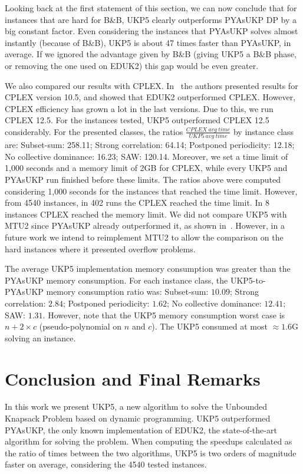 \documentclass[runningheads,a4paper]{llncs}
\begin{document}
Looking back at the first statement of this section, we can now conclude that for instances that are hard for B\&B, UKP5 clearly outperforms PYAsUKP DP by a big constant factor. 
Even considering the instances that PYAsUKP solves almost instantly (because of B\&B), UKP5 is about 47 times faster than PYAsUKP, in average. 
If we ignored the advantage given by B\&B (giving UKP5 a B\&B phase, or removing the one used on EDUK2) this gap would be even greater.

We also compared our results with CPLEX.
In~\cite{pya} the authors presented results for CPLEX version 10.5, and showed that EDUK2 outperformed CPLEX.
However, CPLEX efficiency has grown a lot in the last versions. Due to this, we run CPLEX 12.5.
For the instances tested, UKP5 outperformed CPLEX 12.5 considerably.
For the presented classes, the ratios \(\frac{CPLEX~avg~time}{UKP5~avg~time}\) by instance class are: 
Subset-sum: 258.11; Strong correlation: 64.14; Postponed periodicity: 12.18; No collective dominance: 16.23; SAW: 120.14. 
Moreover, we set a time limit of 1,000 seconds and a memory limit of 2GB for CPLEX, while every UKP5 and PYAsUKP run finished before these limits.
The ratios above were computed considering 1,000 seconds for the instances that reached the time limit.
However, from 4540 instances, in 402 runs the CPLEX reached the time limit.
In 8 instances CPLEX reached the memory limit. 
We did not compare UKP5 with MTU2 since PYAsUKP already outperformed it, as shown in~\cite{pya}.
However, in a future work we intend to reimplement MTU2 to allow the comparison on the hard instances where it presented overflow problems.

The average UKP5 implementation memory consumption was greater than the PYAsUKP memory consumption. For each instance class, the UKP5-to-PYAsUKP memory consumption ratio was: Subset-sum: \(10.09\); Strong correlation: \(2.84\); Postponed periodicity: \(1.62\); No collective dominance: \(12.41\); SAW: \(1.31\). 
However, note that the UKP5 memory consumption worst case is \(n + 2\times c\) (pseudo-polynomial on \(n\) and \(c\)). 
The UKP5 consumed at most \(\approx 1.6\)G solving an instance.

\section{Conclusion and Final Remarks}

In this work we present UKP5, a new algorithm to solve the Unbounded Knapsack Problem based on dynamic programming.
UKP5 outperformed PYAsUKP, the only known implementation of EDUK2, the state-of-the-art algorithm for solving the problem.
When computing the speedups calculated as the ratio of times between the two algorithms, UKP5 is two orders of magnitude faster on average, considering the 4540 tested instances.
\end{document}
